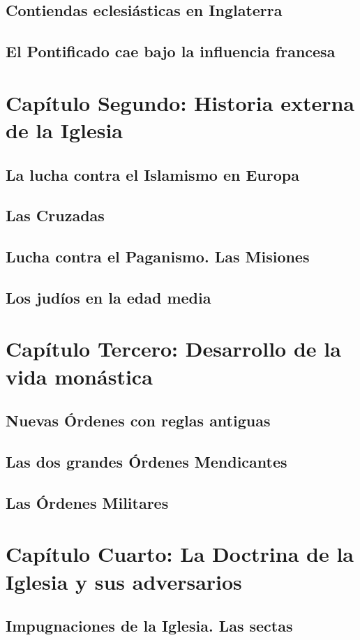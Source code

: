 \raggedbottom{} \documentclass[12pt, a4paper]{book}
\begin{document}
\section{Contiendas eclesiásticas en Inglaterra}
\section{El Pontificado cae bajo la influencia francesa}
\chapter{Capítulo Segundo: Historia externa de  la Iglesia}
\section{La lucha contra el Islamismo en Europa}
\section{Las Cruzadas}
\section{Lucha contra el Paganismo. Las Misiones}
\section{Los judíos en la edad media}
\chapter{Capítulo Tercero: Desarrollo de la vida monástica}
\section{Nuevas Órdenes con reglas antiguas}
\section{Las dos grandes Órdenes Mendicantes}
\section{Las Órdenes Militares}
\chapter{Capítulo Cuarto: La Doctrina de la Iglesia y sus adversarios}
\section{Impugnaciones de la Iglesia. Las sectas}
\end{document}
